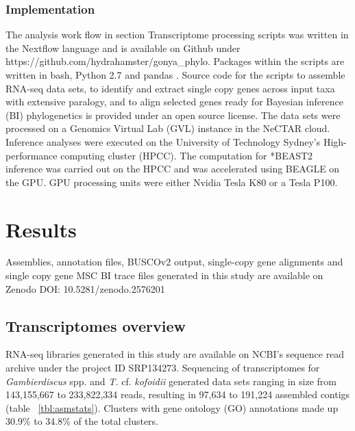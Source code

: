 \documentclass[fleqn,10pt,lineno]{wlpeerj} %
\begin{document}
\subsubsection*{Implementation}
The analysis work flow in section Transcriptome processing scripts was written in the Nextflow language \cite{di2017nextflow} and is available on Github under https://github.com/hydrahamster/gonya\_phylo. 
Packages within the scripts are written in bash, Python 2.7 \cite{stevens2018python} and pandas \cite{pandas}. 
Source code for the scripts to assemble RNA-seq data sets, to identify and extract single copy genes across input taxa with extensive paralogy, and to align selected genes ready for Bayesian inference (BI) phylogenetics is provided under an open source license.
The data sets were processed on a Genomics Virtual Lab (GVL) \cite{afgan2015genomics} instance in the NeCTAR cloud.
Inference analyses were executed on the University of Technology Sydney's High-performance computing cluster (HPCC).  
The computation for *BEAST2 inference was carried out on the HPCC and was accelerated using BEAGLE \cite{ayres2011beagle} on the GPU.
GPU processing units were either Nvidia Tesla K80 or a Tesla P100.

\section*{Results}
Assemblies, annotation files, BUSCOv2 output, single-copy gene alignments and single copy gene MSC BI trace files generated in this study are available on Zenodo DOI: 10.5281/zenodo.2576201

\subsection*{Transcriptomes overview}
RNA-seq libraries generated in this study are available on NCBI's sequence read archive under the project ID SRP134273.
Sequencing of transcriptomes for \emph{Gambierdiscus} spp. and \emph{T.} cf. \emph{kofoidii} generated data sets ranging in size from 143,155,667 to 233,822,334 reads, resulting in 97,634 to 191,224 assembled contigs (table ~\ref{tbl:asmstats}). 
Clusters with gene ontology (GO) annotations made up 30.9\% to 34.8\% of the total clusters. 

\end{document}
